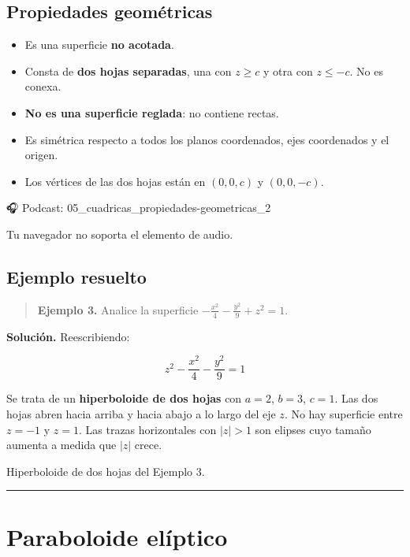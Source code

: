 \documentclass[
]{book}
\providecommand{\tightlist}{%
  \setlength{\itemsep}{0pt}\setlength{\parskip}{0pt}}
\begin{document}
\subsection{Propiedades geométricas}\label{propiedades-geomuxe9tricas-3}

\begin{itemize}
\tightlist
\item
  Es una superficie \textbf{no acotada}.
\item
  Consta de \textbf{dos hojas separadas}, una con \(z \geq c\) y otra con \(z \leq -c\). No es conexa.
\item
  \textbf{No es una superficie reglada}: no contiene rectas.
\item
  Es simétrica respecto a todos los planos coordenados, ejes coordenados y el origen.
\item
  Los vértices de las dos hojas están en \((0, 0, c)\) y \((0, 0, -c)\).
\end{itemize}

🎧 Podcast: 05\_cuadricas\_propiedades-geometricas\_2

Tu navegador no soporta el elemento de audio.

\subsection{Ejemplo resuelto}\label{ejemplo-resuelto-18}

\begin{quote}
\textbf{Ejemplo 3.} Analice la superficie \(-\frac{x^2}{4} - \frac{y^2}{9} + z^2 = 1\).
\end{quote}

\textbf{Solución.} Reescribiendo:

\[
z^2 - \frac{x^2}{4} - \frac{y^2}{9} = 1
\]

Se trata de un \textbf{hiperboloide de dos hojas} con \(a = 2\), \(b = 3\), \(c = 1\). Las dos hojas abren hacia arriba y hacia abajo a lo largo del eje \(z\). No hay superficie entre \(z = -1\) y \(z = 1\). Las trazas horizontales con \(|z| > 1\) son elipses cuyo tamaño aumenta a medida que \(|z|\) crece.

\label{fig:hiperboloide2-ejemplo}Hiperboloide de dos hojas del Ejemplo 3.

\begin{center}\rule{0.5\linewidth}{0.5pt}\end{center}

\section{Paraboloide elíptico}\label{paraboloide-eluxedptico}
\end{document}
